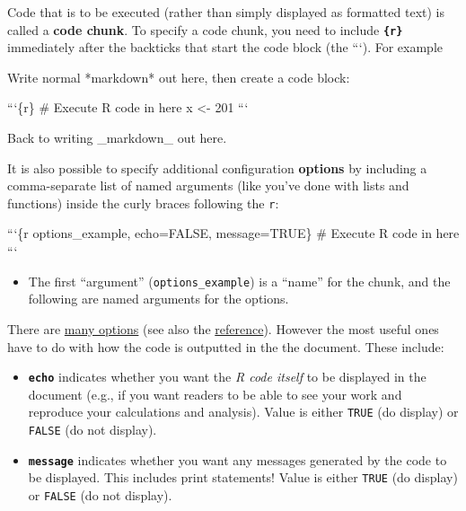 \documentclass[]{book}
\newenvironment{Shaded}{\begin{snugshade}}{\end{snugshade}}
\newcommand{\FunctionTok}[1]{\textcolor[rgb]{0.00,0.00,0.00}{#1}}
\newcommand{\NormalTok}[1]{#1}
\providecommand{\tightlist}{%
  \setlength{\itemsep}{0pt}\setlength{\parskip}{0pt}}
\theoremstyle{definition}
\theoremstyle{definition}
\theoremstyle{remark}
\begin{document}
Code that is to be executed (rather than simply displayed as formatted
text) is called a \textbf{code chunk}. To specify a code chunk, you need
to include \textbf{\texttt{\{r\}}} immediately after the backticks that
start the code block (the ```). For example

\begin{Shaded}
\begin{Highlighting}[]
\NormalTok{Write normal *markdown* out here, then create a code block:}

\NormalTok{```\{r\}}
\FunctionTok{# Execute R code in here}
\NormalTok{x <- 201}
\NormalTok{```}

\NormalTok{Back to writing _markdown_ out here.}
\end{Highlighting}
\end{Shaded}

It is also possible to specify additional configuration \textbf{options}
by including a comma-separate list of named arguments (like you've done
with lists and functions) inside the curly braces following the
\texttt{r}:

\begin{Shaded}
\begin{Highlighting}[]
\NormalTok{```\{r options_example, echo=FALSE, message=TRUE\}}
\FunctionTok{# Execute R code in here}
\NormalTok{```}
\end{Highlighting}
\end{Shaded}

\begin{itemize}
\tightlist
\item
  The first ``argument'' (\texttt{options\_example}) is a ``name'' for
  the chunk, and the following are named arguments for the options.
\end{itemize}

There are \href{https://yihui.name/knitr/options/}{many options} (see
also the
\href{https://www.rstudio.com/wp-content/uploads/2015/03/rmarkdown-reference.pdf}{reference}).
However the most useful ones have to do with how the code is outputted
in the the document. These include:

\begin{itemize}
\tightlist
\item
  \textbf{\texttt{echo}} indicates whether you want the \emph{R code
  itself} to be displayed in the document (e.g., if you want readers to
  be able to see your work and reproduce your calculations and
  analysis). Value is either \texttt{TRUE} (do display) or
  \texttt{FALSE} (do not display).
\item
  \textbf{\texttt{message}} indicates whether you want any messages
  generated by the code to be displayed. This includes print statements!
  Value is either \texttt{TRUE} (do display) or \texttt{FALSE} (do not
  display).
\end{itemize}
\end{document}
